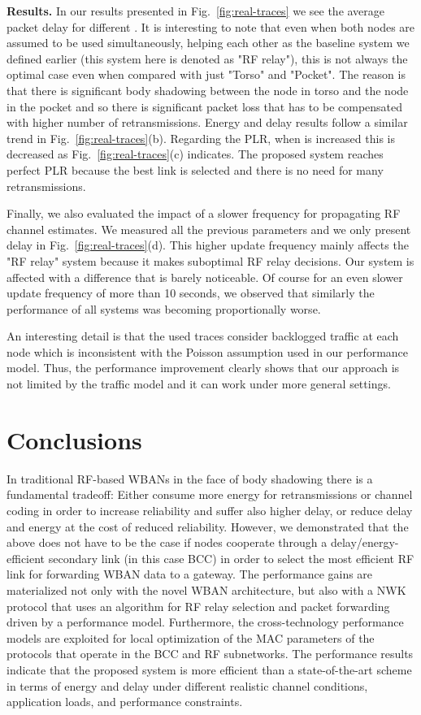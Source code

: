 \documentclass[10pt]{IEEEtran}
\newcounter{section:outage-analysis}
\begin{document}
\textbf{Results.} In our results presented in Fig.~\ref{fig:real-traces} we see the average packet delay for different . It is interesting to note that even when both nodes are assumed to be used simultaneously, helping each other as the baseline system we defined earlier (this system here is denoted as "RF relay"), this is not always the optimal case even when compared with just "Torso" and "Pocket". The reason is that there is significant body shadowing between the node in torso and the node in the pocket and so there is significant packet loss that has to be compensated with higher number of retransmissions. Energy and delay results follow a similar trend in Fig.~\ref{fig:real-traces}(b). Regarding the PLR, when  is increased this is decreased as Fig.~\ref{fig:real-traces}(c) indicates. The proposed system reaches perfect PLR because the best link is selected and there is no need for many retransmissions.

Finally, we also evaluated the impact of a slower frequency for propagating RF channel estimates. We measured all the previous parameters and we only present delay in Fig.~\ref{fig:real-traces}(d). This higher update frequency mainly affects the "RF relay" system because it makes suboptimal RF relay decisions. Our system is affected with a difference that is barely noticeable. Of course for an even slower update frequency of more than 10 seconds, we observed that similarly the performance of all systems was becoming proportionally worse.

An interesting detail is that the used traces consider backlogged traffic at each node which is inconsistent with the Poisson assumption used in our performance model. Thus, the performance improvement clearly shows that our approach is not limited by the traffic model and it can work under more general settings.

\section{Conclusions}
\label{section:conclusions}
In traditional RF-based WBANs in the face of body shadowing there is a fundamental tradeoff: Either consume more energy for retransmissions or channel coding in order to increase reliability and suffer also higher delay, or reduce delay and energy at the cost of reduced reliability. However, we demonstrated that the above does not have to be the case if nodes cooperate through a delay/energy-efficient secondary link (in this case BCC) in order to select the most efficient RF link for forwarding WBAN data to a gateway. The performance gains are materialized not only with the novel WBAN architecture, but also with a NWK protocol that uses an algorithm for RF relay selection and packet forwarding driven by a performance model. Furthermore, the cross-technology performance models are exploited for local optimization of the MAC parameters of the protocols that operate in the BCC and RF subnetworks. The performance results indicate that the proposed system is more efficient than a state-of-the-art scheme in terms of energy and delay under different realistic channel conditions, application loads, and performance constraints.
\end{document}
